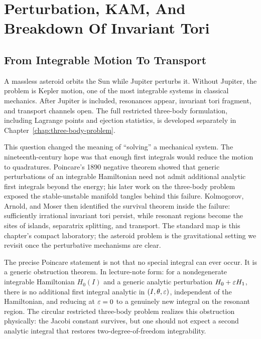 \chapter{Perturbation, KAM, And Breakdown Of Invariant Tori}
\label{chap:perturbation-chaos}

\section{From Integrable Motion To Transport}
\label{sec:perturbation-chapter-purpose}

A massless asteroid orbits the Sun while Jupiter perturbs it. Without Jupiter,
the problem is Kepler motion, one of the most integrable systems in classical
mechanics. After Jupiter is included, resonances appear, invariant tori
fragment, and transport channels open. The full restricted three-body
formulation, including
Lagrange points and ejection statistics, is developed separately in
Chapter~\ref{chap:three-body-problem}.

This question changed the meaning of ``solving'' a mechanical system. The
nineteenth-century hope was that enough first integrals would reduce the motion
to quadratures. Poincare's 1890 negative theorem showed that generic
perturbations of an integrable Hamiltonian need not admit additional analytic
first integrals beyond the energy; his later work on the three-body problem
exposed the stable-unstable manifold tangles behind this failure. Kolmogorov,
Arnold, and Moser then identified the survival theorem inside the failure:
sufficiently irrational invariant tori persist, while resonant regions become
the sites of islands, separatrix splitting, and transport. The standard map is
this chapter's compact laboratory; the asteroid problem is the gravitational
setting we revisit once the perturbative mechanisms are clear.

The precise Poincare statement is not that no special integral can ever occur.
It is a generic obstruction theorem. In lecture-note form: for a nondegenerate
integrable Hamiltonian \(H_0(I)\) and a generic analytic perturbation
\(H_0+\varepsilon H_1\), there is no additional first integral analytic in
\((I,\theta,\varepsilon)\), independent of the Hamiltonian, and reducing at
\(\varepsilon=0\) to a genuinely new integral on the resonant region. The circular
restricted three-body problem realizes this obstruction physically: the Jacobi
constant survives, but one should not expect a second analytic integral that
restores two-degree-of-freedom integrability.


